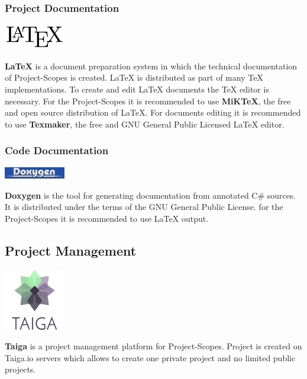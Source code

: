 \subsubsection{Project Documentation}
\begin{center}
	\includegraphics[width=0.2\textwidth]{tools-imgs/prDocLogo}
\end{center}
\noindent\textbf{LaTeX} is a document preparation system in which the technical documentation of Project-Scopes is created. LaTeX is distributed as part of many TeX implementations. To create and edit LaTeX documents the TeX editor is necessary. For the Project-Scopes it is recommended to use \textbf{MiKTeX}, the free and open source distribution of LaTeX. For documents editing it is recommended to use \textbf{Texmaker}, the free and GNU General Public Licensed LaTeX editor.

\subsubsection{Code Documentation}
\begin{center}
	\includegraphics[width=0.2\textwidth]{tools-imgs/cdDocLogo}
\end{center}
\noindent\textbf{Doxygen} is the tool for generating documentation from annotated C\# sources. It is distributed under the terms of the GNU General Public License. for the Project-Scopes it is recommended to use LaTeX output.

\subsection{Project Management}
\begin{center}
	\includegraphics[width=0.2\textwidth]{tools-imgs/mgmtLogo}
\end{center}
\noindent\textbf{Taiga} is a project management platform for Project-Scopes. Project is created on Taiga.io servers which allows to create one private project and no limited public projects.